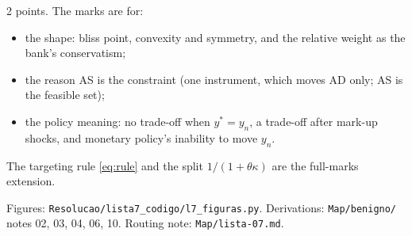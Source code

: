 \documentclass[11pt, a4paper]{article}
\begin{document}
\begin{tcolorbox}[rubricbox]
\small
2 points. The marks are for:
\begin{itemize}
\item the shape: bliss point, convexity and symmetry, and the relative weight as the
      bank's conservatism;
\item the reason AS is the constraint (one instrument, which moves AD only; AS is the
      feasible set);
\item the policy meaning: no trade-off when $y^\ast=y_n$, a trade-off after mark-up shocks,
      and monetary policy's inability to move $y_n$.
\end{itemize}
The targeting rule \eqref{eq:rule} and the split $1/(1+\theta\kappa)$ are the full-marks
extension.
\end{tcolorbox}

\vspace{6pt}
\begin{center}
\small\color{gray}
Figures: \texttt{Resolucao/lista7\_codigo/l7\_figuras.py}. Derivations:
\texttt{Map/benigno/} notes 02, 03, 04, 06, 10. Routing note: \texttt{Map/lista-07.md}.
\end{center}
\end{document}

